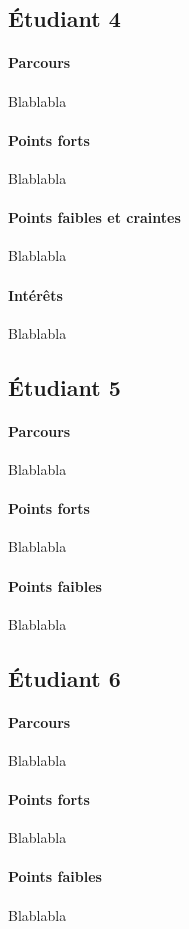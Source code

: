 	\subsection{Étudiant 4}
		\paragraph*{Parcours}
			Blablabla
		\paragraph*{Points forts}
			Blablabla
		\paragraph*{Points faibles et craintes}
			Blablabla
		\paragraph*{Intérêts}
			Blablabla	
	
	\subsection{Étudiant 5}
		\paragraph*{Parcours}
			Blablabla
		\paragraph*{Points forts}
			Blablabla
		\paragraph*{Points faibles}
			Blablabla	
	
	\subsection{Étudiant 6}
		\paragraph*{Parcours}
			Blablabla
		\paragraph*{Points forts}
			Blablabla
		\paragraph*{Points faibles}
			Blablabla
